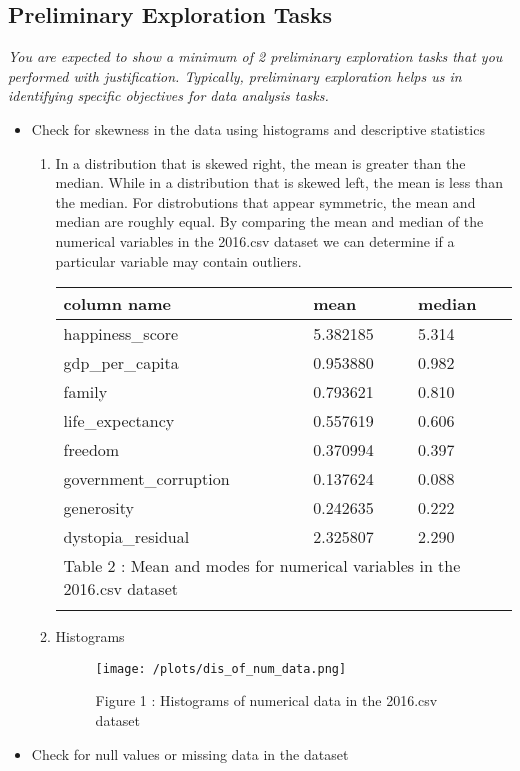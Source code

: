 \documentclass{article}%
\begin{document}
\subsection{Preliminary Exploration Tasks}%
\label{subsec:PreliminaryExplorationTasks}%
\textit{You are expected to show a minimum of 2 preliminary exploration tasks that you performed with justification. Typically, preliminary exploration helps us in identifying specific objectives for data analysis tasks.}%
\begin{itemize}%
\item%
Check for skewness in the data using histograms and descriptive statistics%
\begin{enumerate}%
\item%
In a distribution that is skewed right, the mean is greater than the median. While in a distribution that is skewed left, the mean is less than the median. For distrobutions                 that appear symmetric, the mean and median are roughly equal. By comparing the mean and median of the numerical variables in the 2016.csv dataset we can determine if a particular variable may contain outliers.%
\begin{longtable}{l l l}%
\hline%
column name&mean&median\\%
\hline%
\endhead%
\hline%
happiness\_score&5.382185&5.314\\%
gdp\_per\_capita&0.953880&0.982\\%
family&0.793621&0.810\\%
life\_expectancy&0.557619&0.606\\%
freedom&0.370994&0.397\\%
government\_corruption&0.137624&0.088\\%
generosity&0.242635&0.222\\%
dystopia\_residual&2.325807&2.290\\%
\hline%
\multicolumn{3}{l}{Table 2 : Mean and modes for numerical variables in the 2016.csv dataset}\\%
\endlastfoot%
\end{longtable}%
\item%
Histograms%


\begin{figure}[h!]%
\centering%
\texttt{[image: /plots/dis\_of\_num\_data.png]}%
\caption{Figure 1 : Histograms of numerical data in the 2016.csv dataset}%
\end{figure}

%
\end{enumerate}%
\item%
Check for null values or missing data in the dataset%
\end{itemize}

%
\end{document}
